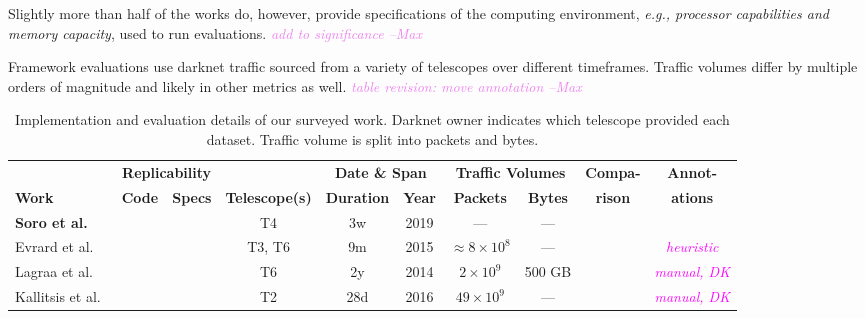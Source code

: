 \documentclass[manuscript,nonacm]{acmart}
\newcommand{\cmark}{\ding{51}}%
\newcommand{\xmark}{\ding{55}}%
\newcommand{\wc}[1]{\textit{\textcolor{magenta}{#1}}} %
\newcommand{\maxnote}[1]{\textit{\textcolor{violet}{#1 --Max}}}
\begin{document}
Slightly more than half of the works do, however, provide specifications of the computing environment, \textit{e.g., processor capabilities and memory capacity}, used to run evaluations.
\maxnote{add to significance}

Framework evaluations use darknet traffic sourced from a variety of telescopes over different timeframes.
Traffic volumes differ by multiple orders of magnitude and likely in other metrics as well.
\maxnote{table revision: move annotation}



\begin{table*}[h!]
	\small
	\setlength{\tabcolsep}{4pt}
	\caption{Implementation and evaluation details of our surveyed work. Darknet owner indicates which telescope provided each dataset. Traffic volume is split into packets and bytes.}
	\label{tab:eval}
	\begin{tabular}{@{}lccccccccc@{}}
		\toprule
		& \multicolumn{2}{c}{\bf Replicability}			 &  & \multicolumn{2}{c}{\bf Date \& Span} & \multicolumn{2}{c}{\bf Traffic Volumes} &\textbf{Compa-}&\textbf{Annot-}\\
		\textbf{Work} & \textbf{Code} & \textbf{Specs} & \textbf{Telescope(s)} & \textbf{Duration} & \textbf{Year} 
		& \textbf{Packets} & \textbf{Bytes} & \textbf{rison} & \textbf{ations} \\
		\midrule
		\textbf{Soro et al.~\cite{2020soro}}                   
		& \xmark & \xmark           
		& T4            
		& 3w    & 2019    
		& ---                  
		& ---              
		& \xmark            
		& \xmark          \\
		
		Evrard et al.~\cite{2019evrard}                        
		& \xmark & \xmark           
		& T3, T6  
		& 9m    & 2015    
		& ${\approx}8\times10^{8}$ 
		& ---              
		& \xmark            
		& \wc{heuristic}  \\
		
		Lagraa et al.~\cite{2017lagraa,2019lagraa}             
		& \xmark & \cmark           
		& T6          
		& 2y    & 2014    
		& $2\times10^{9}$ 
		& 500 GB        
		& \xmark            
		& \wc{manual, DK}\\
		
		Kallitsis et al.~\cite{2022kallitsis}                  
		& \cmark & \cmark           
		& T2
		& 28d   & 2016    
		& $49\times10^{9}$
		& ---              
		& \cmark~\cite{2021gioacchini} 
		& \wc{manual, DK}\\
		

\end{tabular}
\end{table*}
\end{document}
